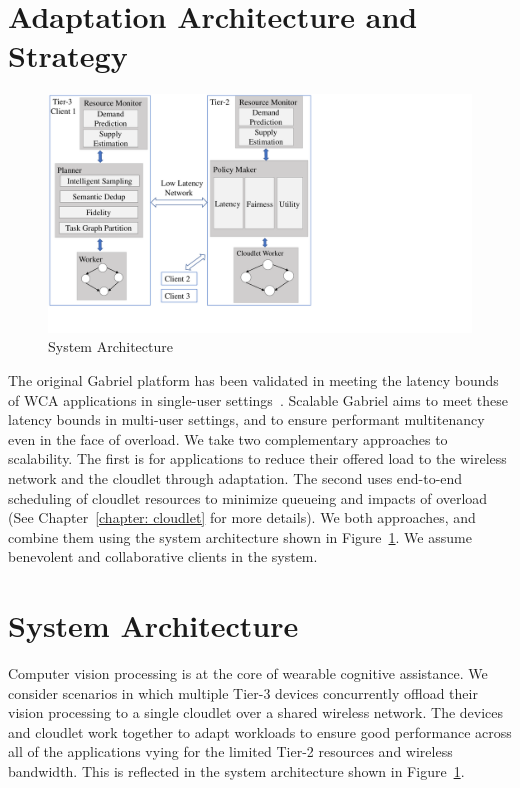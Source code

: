 \section{Adaptation Architecture and Strategy}

\begin{figure}[h]
\centering
\includegraphics[width=\textwidth,trim=0 3em 11cm 0, clip]{FIGS/arch-vertical.pdf}
\vspace{-0.3in}
\caption{\small System Architecture}
\label{fig:arch}
\end{figure}

The original Gabriel platform has been validated in meeting the latency bounds
of WCA applications in single-user settings~\cite{chen2017empirical}.  Scalable
Gabriel aims to meet these latency bounds in multi-user settings, and to ensure
performant multitenancy even in the face of overload.  We take two complementary
approaches to scalability.  The first is for applications to reduce their
offered load to the wireless network and the cloudlet through adaptation.  The
second uses end-to-end scheduling of cloudlet resources to minimize queueing and
impacts of overload (See Chapter~\ref{chapter: cloudlet} for more details).  We
both approaches, and combine them using the system architecture shown in
Figure~\ref{fig:arch}.  We assume benevolent and collaborative clients in the
system.

\section{System Architecture}

Computer vision processing is at the core of wearable cognitive assistance. We
consider scenarios in which multiple Tier-3 devices concurrently offload their
vision processing to a single cloudlet over a shared wireless network.  The
devices and cloudlet work together to adapt workloads to ensure good performance
across all of the applications vying for the limited Tier-2 resources and
wireless bandwidth.  This is reflected in the system architecture shown in
Figure~\ref{fig:arch}.

